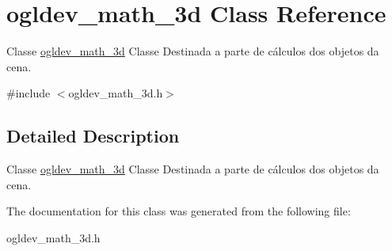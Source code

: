 \hypertarget{classogldev__math__3d}{\section{ogldev\-\_\-math\-\_\-3d Class Reference}
\label{classogldev__math__3d}
}


Classe \hyperlink{classogldev__math__3d}{ogldev\-\_\-math\-\_\-3d} Classe Destinada a parte de cálculos dos objetos da cena.  




{\ttfamily \#include $<$ogldev\-\_\-math\-\_\-3d.\-h$>$}



\subsection{Detailed Description}
Classe \hyperlink{classogldev__math__3d}{ogldev\-\_\-math\-\_\-3d} Classe Destinada a parte de cálculos dos objetos da cena. 

The documentation for this class was generated from the following file\-:\begin{DoxyCompactItemize}
\item 
ogldev\-\_\-math\-\_\-3d.\-h\end{DoxyCompactItemize}
